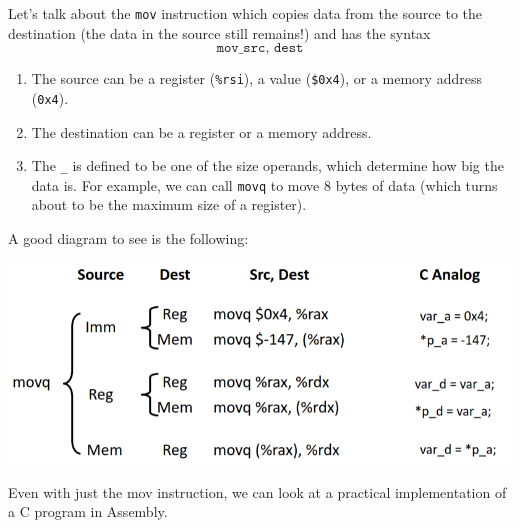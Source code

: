 \documentclass{article}
\begin{document}
  \begin{definition}[mov]
    Let's talk about the \texttt{mov} instruction which copies data from the source to the destination (the data in the source still remains!) and has the syntax 
    \begin{equation}
      \texttt{mov\_ src, dest}
    \end{equation}
    \begin{enumerate}
      \item The source can be a register (\texttt{\%rsi}), a value (\texttt{\$0x4}), or a memory address (\texttt{0x4}).
      \item The destination can be a register or a memory address. 
      \item The \texttt{\_} is defined to be one of the size operands, which determine how big the data is. For example, we can call \texttt{movq} to move 8 bytes of data (which turns about to be the maximum size of a register). 
    \end{enumerate}
    A good diagram to see is the following: 
    \begin{center}  
      \includegraphics[scale=0.5]{img/movq.png}
    \end{center} 
  \end{definition}

  Even with just the mov instruction, we can look at a practical implementation of a C program in Assembly. 
\end{document}
